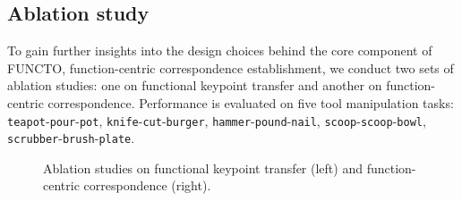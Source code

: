 

\subsection{Ablation study}
To gain further insights into the design choices behind the core component of FUNCTO, function-centric correspondence establishment, we conduct two sets of ablation studies: one on functional keypoint transfer and another on function-centric correspondence. Performance is evaluated on five tool manipulation tasks: \texttt{teapot}-\texttt{pour}-\texttt{pot}, \texttt{knife}-\texttt{cut}-\texttt{burger}, \texttt{hammer}-\texttt{pound}-\texttt{nail}, \texttt{scoop}-\texttt{scoop}-\texttt{bowl}, \texttt{scrubber}-\texttt{brush}-\texttt{plate}. \\


\begin{figure*}[t]
  \hspace*{0in}
  \vspace*{-0.1in}
  \caption{Ablation studies on functional keypoint transfer (left) and function-centric correspondence (right).}
  \label{fig:ablation}
  \vspace*{-0.2in}
\end{figure*}


